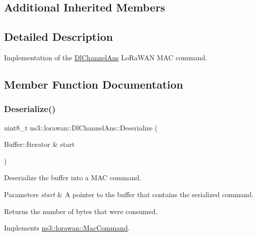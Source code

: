 \subsection*{Additional Inherited Members}


\subsection{Detailed Description}
Implementation of the \hyperlink{classns3_1_1lorawan_1_1DlChannelAns}{Dl\+Channel\+Ans} Lo\+Ra\+W\+AN M\+AC command. 

\subsection{Member Function Documentation}
\mbox{\label{classns3_1_1lorawan_1_1DlChannelAns_a15482fde8754d5fa211754ef2352e514}} 
\subsubsection{\texorpdfstring{Deserialize()}{Deserialize()}}
{\footnotesize\ttfamily uint8\+\_\+t ns3\+::lorawan\+::\+Dl\+Channel\+Ans\+::\+Deserialize (\begin{DoxyParamCaption}\item[{Buffer\+::\+Iterator \&}]{start }\end{DoxyParamCaption})\hspace{0.3cm}{\ttfamily [virtual]}}

Deserialize the buffer into a M\+AC command.


\begin{DoxyParams}{Parameters}
{\em start} & A pointer to the buffer that contains the serialized command. \\
\hline
\end{DoxyParams}
\begin{DoxyReturn}{Returns}
the number of bytes that were consumed. 
\end{DoxyReturn}


Implements \hyperlink{classns3_1_1lorawan_1_1MacCommand_af12d223a71a67196bce498f1240eda75}{ns3\+::lorawan\+::\+Mac\+Command}.

\mbox{\label{classns3_1_1lorawan_1_1DlChannelAns_a1dbe96549927ce3aa98c8d68a341f5bd}} 
